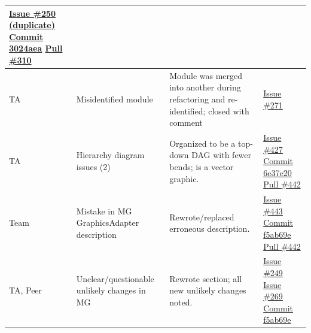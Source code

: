 \documentclass[12pt, titlepage]{article}
\begin{document}
\begin{longtable}{|p{2cm}|p{4cm}|p{5cm}|p{3cm}|}
\newline\href{https://github.com/OmarHassanAdelhamid/Five-of-a-Kind-capstone-project-/issues/250}{Issue \#250 (duplicate)}
\newline\href{https://github.com/OmarHassanAdelhamid/Five-of-a-Kind-capstone-project-/pull/310/commits/3024aea8910e0dafd3227d653f9d8359b277b5ec}{Commit 3024aea}
\newline\href{https://github.com/OmarHassanAdelhamid/Five-of-a-Kind-capstone-project-/pull/310}{Pull \#310} \\ \hline
TA & Misidentified module & Module was merged into another during refactoring and re-identified; closed with comment & \href{https://github.com/OmarHassanAdelhamid/Five-of-a-Kind-capstone-project-/issues/271}{Issue \#271} \\ \hline
TA & Hierarchy diagram issues (2) & Organized to be a top-down DAG with fewer bends; is a vector graphic. & \href{https://github.com/OmarHassanAdelhamid/Five-of-a-Kind-capstone-project-/issues/427}{Issue \#427}
\newline\href{https://github.com/OmarHassanAdelhamid/Five-of-a-Kind-capstone-project-/pull/442/commits/6e37e20d778a381496a3eb90bab1a087da8fc3d6}{Commit 6e37e20}
\newline\href{https://github.com/OmarHassanAdelhamid/Five-of-a-Kind-capstone-project-/pull/442}{Pull \#442} \\ \hline
Team & Mistake in MG GraphicsAdapter description & Rewrote/replaced erroneous description. & \href{https://github.com/OmarHassanAdelhamid/Five-of-a-Kind-capstone-project-/issues/443}{Issue \#443}
\newline\href{https://github.com/OmarHassanAdelhamid/Five-of-a-Kind-capstone-project-/pull/442/commits/f5ab69ed317064499814f008bf446b8cde2b4949}{Commit f5ab69e}
\newline\href{https://github.com/OmarHassanAdelhamid/Five-of-a-Kind-capstone-project-/pull/442}{Pull \#442} \\ \hline
TA, Peer & Unclear/questionable unlikely changes in MG & Rewrote section; all new unlikely changes noted. & \href{https://github.com/OmarHassanAdelhamid/Five-of-a-Kind-capstone-project-/issues/249}{Issue \#249}
\newline\href{https://github.com/OmarHassanAdelhamid/Five-of-a-Kind-capstone-project-/issues/269}{Issue \#269}
\newline\href{https://github.com/OmarHassanAdelhamid/Five-of-a-Kind-capstone-project-/pull/442/commits/f5ab69ed317064499814f008bf446b8cde2b4949}{Commit f5ab69e}

\end{longtable}
\end{document}

